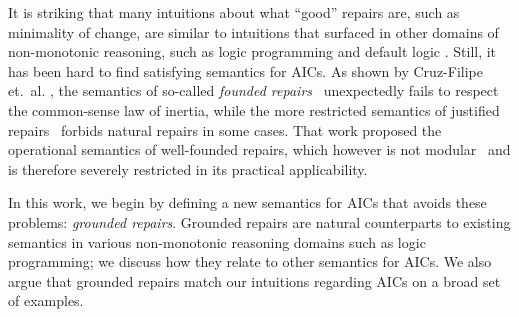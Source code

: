 \documentclass[runningheads]{llncs}
\begin{document}

It is striking that many intuitions about what ``good'' repairs are, such as minimality of change, are similar to intuitions that surfaced in other domains of non-monotonic reasoning, such as logic programming  and default logic . 
Still, it has been hard to find satisfying semantics for AICs.
As shown by Cruz-Filipe et.\ al. \cite{tase/Cruz-FilipeGEN13}, the semantics of so-called \emph{founded repairs}~\cite{iclp/CaropreseGSZ06} unexpectedly fails to respect the common-sense law of inertia, while the more restricted semantics of justified repairs~\cite{tplp/CaropreseT11} forbids natural repairs in some cases.
That work proposed the operational semantics of well-founded repairs, which however is not modular~\cite{foiks/Cruz-Filipe14} and is therefore severely restricted in its practical applicability.


In this work, we begin by defining a new semantics for AICs that avoids these problems: \emph{grounded repairs}.
Grounded repairs are natural counterparts to existing semantics in various non-monotonic reasoning domains such as logic programming; we discuss how they relate to other semantics for AICs.
We also argue that grounded repairs match our intuitions regarding AICs on a broad set of examples. 
\end{document}
